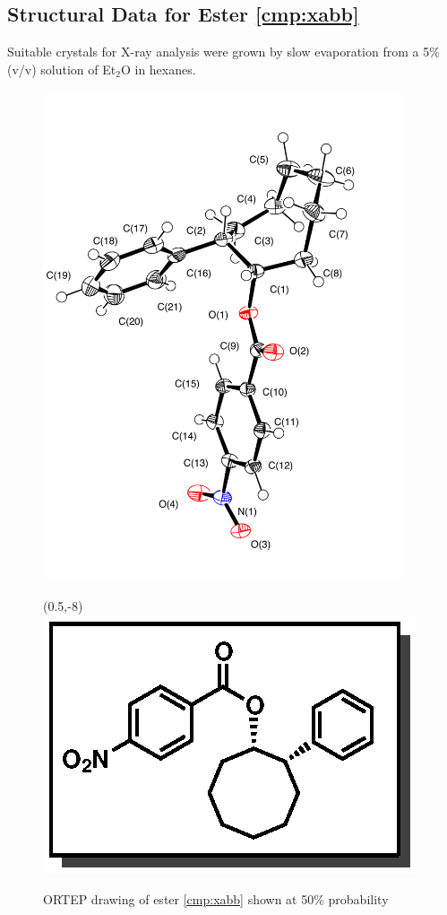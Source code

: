 \subsection{Structural Data for Ester \ref{cmp:xabb}}
Suitable crystals for X-ray analysis were grown by slow evaporation from a 5\% (v/v) solution of
Et$_2$O in hexanes.
\begin{figure}[h]
  \centering
  \includegraphics[width=4.2in]{chp_asymmetric/images/xray/xabb_labelled}
  \begin{textblock}{1}(0.5,-8)
\includegraphics[scale=0.8]{chp_asymmetric/images/xabb}
\end{textblock}
  \caption{ORTEP drawing of ester \ref{cmp:xabb} shown at 50\% probability }
\end{figure}

